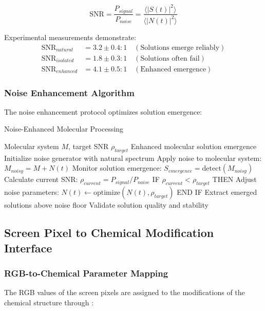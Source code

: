 \documentclass[12pt,a4paper]{article}
\begin{document}
\begin{equation}
\text{SNR} = \frac{P_{signal}}{P_{noise}} = \frac{\langle |S(t)|^2 \rangle}{\langle |N(t)|^2 \rangle}
\end{equation}

Experimental measurements demonstrate:
\begin{align}
\text{SNR}_{natural} &= 3.2 \pm 0.4 : 1 \quad (\text{Solutions emerge reliably}) \\
\text{SNR}_{isolated} &= 1.8 \pm 0.3 : 1 \quad (\text{Solutions often fail}) \\
\text{SNR}_{enhanced} &= 4.1 \pm 0.5 : 1 \quad (\text{Enhanced emergence})
\end{align}

\subsubsection{Noise Enhancement Algorithm}

The noise enhancement protocol optimizes solution emergence:

\begin{algorithm}[H]
\caption{Noise-Enhanced Molecular Processing}
\begin{algorithmic}[1]
\REQUIRE Molecular system $M$, target SNR $\rho_{target}$
\ENSURE Enhanced molecular solution emergence
\STATE Initialize noise generator with natural spectrum
\STATE Apply noise to molecular system: $M_{noisy} = M + N(t)$
\STATE Monitor solution emergence: $S_{emergence} = \text{detect}(M_{noisy})$
\STATE Calculate current SNR: $\rho_{current} = P_{signal}/P_{noise}$
\STATE IF $\rho_{current} < \rho_{target}$ THEN
\STATE \quad Adjust noise parameters: $N(t) \leftarrow \text{optimize}(N(t), \rho_{target})$
\STATE END IF
\STATE Extract emerged solutions above noise floor
\STATE Validate solution quality and stability
\end{algorithmic}
\end{algorithm}

\subsection{Screen Pixel to Chemical Modification Interface}

\subsubsection{RGB-to-Chemical Parameter Mapping}

The RGB values of the screen pixels are assigned to the modifications of the chemical structure through \cite{jensen2017introduction}:
\end{document}
